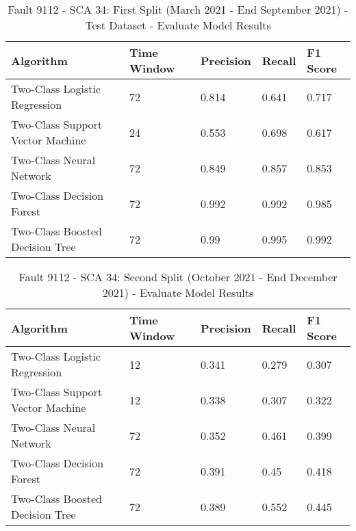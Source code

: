 \begin{table}[!ht]
    \centering
    \begin{tabular}{|l|l|l|l|l|}
    \hline
        Algorithm & Time Window & Precision & Recall & F1 Score \\ \hline
        Two-Class Logistic Regression & 72 & 0.814 & 0.641 & 0.717 \\ \hline
        Two-Class Support Vector Machine & 24 & 0.553 & 0.698 & 0.617 \\ \hline
        Two-Class Neural Network & 72 & 0.849 & 0.857 & 0.853 \\ \hline
        Two-Class Decision Forest & 72 & 0.992 & 0.992 & 0.985 \\ \hline
        Two-Class Boosted Decision Tree & 72 & 0.99 & 0.995 & 0.992 \\ \hline
    \end{tabular}
    \caption{Fault 9112 - SCA 34: First Split (March 2021 - End September 2021) - Test Dataset - Evaluate Model Results}
    \label{9112_SCA34_1st}
\end{table}

\begin{table}[!ht]
    \centering
    \begin{tabular}{|l|l|l|l|l|}
    \hline
        Algorithm & Time Window & Precision & Recall & F1 Score \\ \hline
        Two-Class Logistic Regression & 12 & 0.341 & 0.279 & 0.307 \\ \hline
        Two-Class Support Vector Machine & 12 & 0.338 & 0.307 & 0.322 \\ \hline
        Two-Class Neural Network & 72 & 0.352 & 0.461 & 0.399 \\ \hline
        Two-Class Decision Forest & 72 & 0.391 & 0.45 & 0.418 \\ \hline
        Two-Class Boosted Decision Tree & 72 & 0.389 & 0.552 & 0.445 \\ \hline
    \end{tabular}
    \caption{Fault 9112 - SCA 34: Second Split (October 2021 - End December 2021) - Evaluate Model Results}
    \label{9112_SCA34_2nd}
\end{table}

